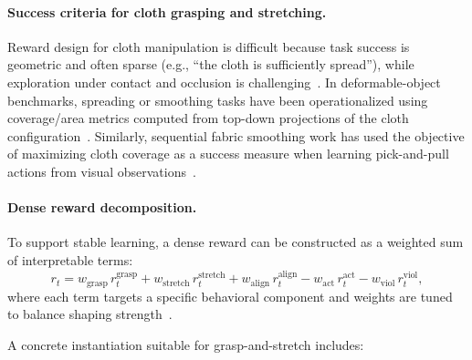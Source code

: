 \paragraph{Success criteria for cloth grasping and stretching.}
Reward design for cloth manipulation is difficult because task success is geometric and often sparse (e.g., ``the cloth is sufficiently spread''), while exploration under contact and occlusion is challenging~\cite{Lin2021SoftGym,Kadi2023ClothLikeReview}. In deformable-object benchmarks, spreading or smoothing tasks have been operationalized using coverage/area metrics computed from top-down projections of the cloth configuration~\cite{Lin2021SoftGym}. Similarly, sequential fabric smoothing work has used the objective of maximizing cloth coverage as a success measure when learning pick-and-pull actions from visual observations~\cite{Seita2020FabricSmoothing}.

\paragraph{Dense reward decomposition.}
To support stable learning, a dense reward can be constructed as a weighted sum of interpretable terms:
\begin{equation}
r_t = w_{\text{grasp}} \, r^{\text{grasp}}_t + w_{\text{stretch}} \, r^{\text{stretch}}_t + w_{\text{align}} \, r^{\text{align}}_t - w_{\text{act}} \, r^{\text{act}}_t - w_{\text{viol}} \, r^{\text{viol}}_t,
\label{eq:cloth_reward_decomposition}
\end{equation}
where each term targets a specific behavioral component and weights are tuned to balance shaping strength~\cite{SuttonBarto2018,isaaclab_task_design_workflows}.

A concrete instantiation suitable for grasp-and-stretch includes:

